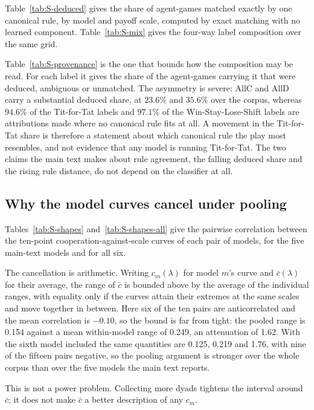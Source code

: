 \documentclass[openacc]{rsproca_new}
\newcommand{\lam}{\lambda}
\begin{document}
Table~\ref{tab:S-deduced} gives the share of agent-games matched exactly by one
canonical rule, by model and payoff scale, computed by exact matching with no
learned component. Table~\ref{tab:S-mix} gives the four-way label composition
over the same grid.

Table~\ref{tab:S-provenance} is the one that bounds how the composition may be
read. For each label it gives the share of the agent-games carrying it that
were deduced, ambiguous or unmatched. The asymmetry is severe: AllC and AllD
carry a substantial deduced share, at $23.6\%$ and $35.6\%$ over the corpus,
whereas $94.6\%$ of the Tit-for-Tat labels and $97.1\%$ of the
Win-Stay-Lose-Shift labels are attributions made where no canonical rule fits
at all. A movement in the Tit-for-Tat share is therefore a
statement about which canonical rule the play most resembles, and not evidence
that any model is running Tit-for-Tat. The two claims the main text makes about
rule agreement, the falling deduced share and the rising rule distance, do not
depend on the classifier at all.

\subsection{Why the model curves cancel under pooling}\label{appendix:pooling}

Tables~\ref{tab:S-shapes} and~\ref{tab:S-shapes-all} give the pairwise
correlation between the ten-point cooperation-against-scale curves of each pair
of models, for the five main-text models and for all six.

The cancellation is arithmetic. Writing $c_m(\lam)$ for model $m$'s curve and
$\bar{c}(\lam)$ for their average, the range of $\bar{c}$ is bounded above by
the average of the individual ranges, with equality only if the curves attain
their extremes at the same scales and move together in between. Here six of the
ten pairs are anticorrelated and the mean correlation is $-0.10$, so the bound
is far from tight: the pooled range is 0.154 against a mean within-model range
of 0.249, an attenuation of 1.62. With the sixth model included the same
quantities are 0.125, 0.219 and 1.76, with nine of the fifteen pairs negative,
so the pooling argument is stronger over the whole corpus than over the five
models the main text reports.

This is not a power problem. Collecting more dyads tightens the interval around
$\bar{c}$; it does not make $\bar{c}$ a better description of any $c_m$.
\end{document}
